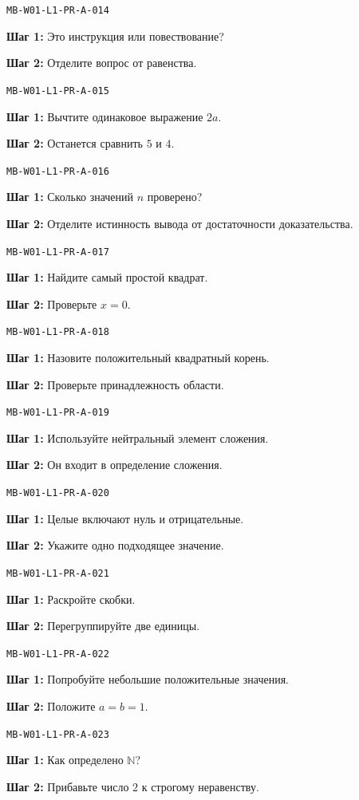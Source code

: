 \documentclass[11pt,a4paper,openany]{book}
\newcommand{\muid}[1]{\texttt{\footnotesize #1}}
\begin{document}
\noindent\muid{MB-W01-L1-PR-A-014}\par 
\textbf{Шаг 1:} Это инструкция или повествование?\par \textbf{Шаг 2:} Отделите вопрос от равенства.\smallskip

\noindent\muid{MB-W01-L1-PR-A-015}\par 
\textbf{Шаг 1:} Вычтите одинаковое выражение $2a$.\par \textbf{Шаг 2:} Останется сравнить $5$ и $4$.\smallskip

\noindent\muid{MB-W01-L1-PR-A-016}\par 
\textbf{Шаг 1:} Сколько значений $n$ проверено?\par \textbf{Шаг 2:} Отделите истинность вывода от достаточности доказательства.\smallskip

\noindent\muid{MB-W01-L1-PR-A-017}\par 
\textbf{Шаг 1:} Найдите самый простой квадрат.\par \textbf{Шаг 2:} Проверьте $x=0$.\smallskip

\noindent\muid{MB-W01-L1-PR-A-018}\par 
\textbf{Шаг 1:} Назовите положительный квадратный корень.\par \textbf{Шаг 2:} Проверьте принадлежность области.\smallskip

\noindent\muid{MB-W01-L1-PR-A-019}\par 
\textbf{Шаг 1:} Используйте нейтральный элемент сложения.\par \textbf{Шаг 2:} Он входит в определение сложения.\smallskip

\noindent\muid{MB-W01-L1-PR-A-020}\par 
\textbf{Шаг 1:} Целые включают нуль и отрицательные.\par \textbf{Шаг 2:} Укажите одно подходящее значение.\smallskip

\noindent\muid{MB-W01-L1-PR-A-021}\par 
\textbf{Шаг 1:} Раскройте скобки.\par \textbf{Шаг 2:} Перегруппируйте две единицы.\smallskip

\noindent\muid{MB-W01-L1-PR-A-022}\par 
\textbf{Шаг 1:} Попробуйте небольшие положительные значения.\par \textbf{Шаг 2:} Положите $a=b=1$.\smallskip

\noindent\muid{MB-W01-L1-PR-A-023}\par 
\textbf{Шаг 1:} Как определено $\mathbb N$?\par \textbf{Шаг 2:} Прибавьте число $2$ к строгому неравенству.\smallskip
\end{document}
